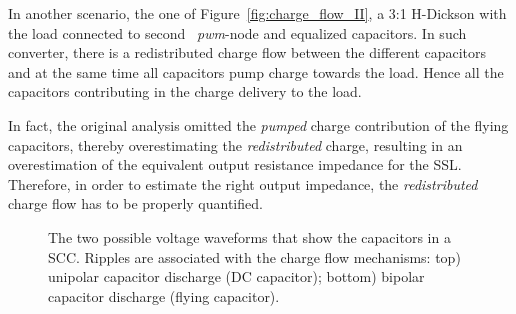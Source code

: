 In another scenario, the one of Figure~\ref{fig:charge_flow_II},  a 3:1 H-Dickson with the load connected to second ~\emph{pwm}-node and equalized capacitors. In such converter, there is a redistributed charge flow between the different capacitors and at the same time all capacitors pump charge towards the load. Hence all the capacitors contributing in the charge delivery to the load.

In fact, the original analysis omitted the \emph{pumped} charge contribution of the flying capacitors, thereby overestimating the \emph{redistributed} charge, resulting in an overestimation of the equivalent output resistance impedance for the SSL. Therefore, in order to estimate the right output impedance, the \emph{redistributed} charge flow has to be properly quantified.\\

\begin{figure}[!h]
\centering

\caption{The two possible voltage waveforms that show the capacitors in a SCC. Ripples are associated with the charge flow mechanisms: top) unipolar capacitor discharge (DC capacitor); bottom) bipolar capacitor discharge (flying capacitor).}
\label{fig:cap_riples}
\end{figure}

